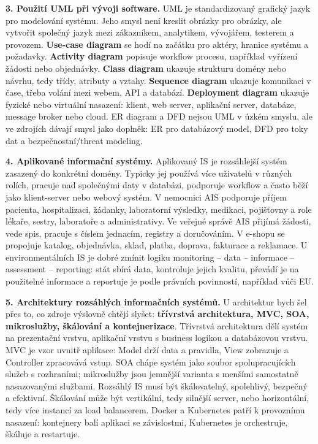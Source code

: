 \documentclass[11pt,a4paper]{article}
\begin{document}
\begin{greenbox}
\textbf{3. Použití UML při vývoji software.} UML je standardizovaný grafický jazyk pro modelování systému. Jeho smysl není kreslit obrázky pro obrázky, ale vytvořit společný jazyk mezi zákazníkem, analytikem, vývojářem, testerem a provozem. \textbf{Use-case diagram} se hodí na začátku pro aktéry, hranice systému a požadavky. \textbf{Activity diagram} popisuje workflow procesu, například vyřízení žádosti nebo objednávky. \textbf{Class diagram} ukazuje strukturu domény nebo návrhu, tedy třídy, atributy a vztahy. \textbf{Sequence diagram} ukazuje komunikaci v čase, třeba volání mezi webem, API a databází. \textbf{Deployment diagram} ukazuje fyzické nebo virtuální nasazení: klient, web server, aplikační server, databáze, message broker nebo cloud. ER diagram a DFD nejsou UML v úzkém smyslu, ale ve zdrojích dávají smysl jako doplněk: ER pro databázový model, DFD pro toky dat a bezpečnostní/threat modeling.

\textbf{4. Aplikované informační systémy.} Aplikovaný IS je rozsáhlejší systém zasazený do konkrétní domény. Typicky jej používá více uživatelů v různých rolích, pracuje nad společnými daty v databázi, podporuje workflow a často běží jako klient-server nebo webový systém. V nemocnici AIS podporuje příjem pacienta, hospitalizaci, žádanky, laboratorní výsledky, medikaci, pojišťovny a role lékaře, sestry, laboratoře a administrativy. Ve veřejné správě AIS přijímá žádosti, vede spis, pracuje s číslem jednacím, registry a doručováním. V e-shopu se propojuje katalog, objednávka, sklad, platba, doprava, fakturace a reklamace. U environmentálních IS je dobré zmínit logiku monitoring -- data -- informace -- assessment -- reporting: stát sbírá data, kontroluje jejich kvalitu, převádí je na použitelné informace a reportuje je podle právních povinností, například vůči EU.

\textbf{5. Architektury rozsáhlých informačních systémů.} U architektur bych šel přes to, co zdroje výslovně chtějí slyšet: \textbf{třívrstvá architektura, MVC, SOA, mikroslužby, škálování a kontejnerizace}. Třívrstvá architektura dělí systém na prezentační vrstvu, aplikační vrstvu s business logikou a databázovou vrstvu. MVC je vzor uvnitř aplikace: Model drží data a pravidla, View zobrazuje a Controller zpracovává vstup. SOA chápe systém jako soubor spolupracujících služeb s rozhraními; mikroslužby jsou jemnější varianta s menšími samostatně nasazovanými službami. Rozsáhlý IS musí být škálovatelný, spolehlivý, bezpečný a efektivní. Škálování může být vertikální, tedy silnější server, nebo horizontální, tedy více instancí za load balancerem. Docker a Kubernetes patří k provoznímu nasazení: kontejnery balí aplikaci se závislostmi, Kubernetes je orchestruje, škáluje a restartuje.


\end{greenbox}
\end{document}
